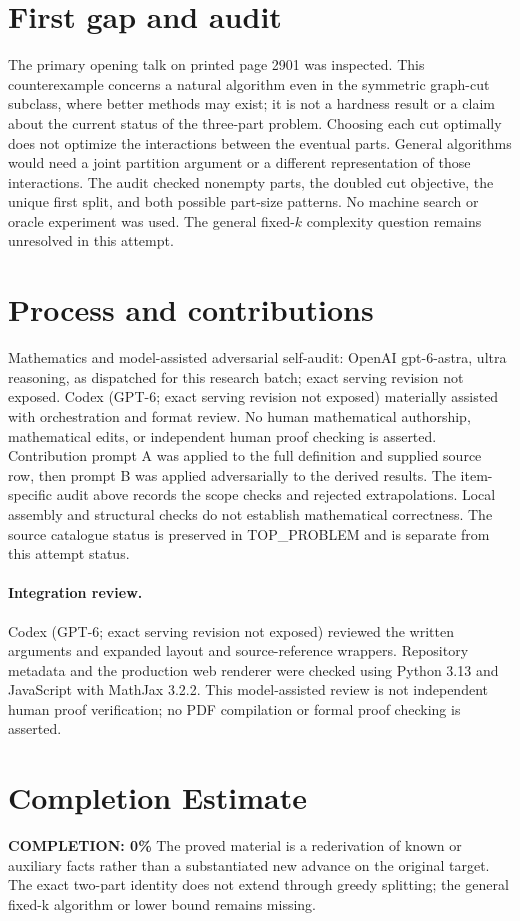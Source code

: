 \documentclass[11pt]{article}
\begin{document}
\section{First gap and audit}
The primary opening talk on printed page 2901 was inspected. This
counterexample concerns a natural algorithm even in the symmetric
graph-cut subclass, where better methods may exist; it is not a
hardness result or a claim about the current status of the three-part
problem. Choosing each cut optimally does not optimize the interactions
between the eventual parts. General algorithms would need a joint
partition argument or a different representation of those interactions.
The audit checked nonempty parts, the doubled cut objective, the
unique first split, and both possible part-size patterns. No machine
search or oracle experiment was used. The general fixed-$k$ complexity
question remains unresolved in this attempt.

\section{Process and contributions}
Mathematics and model-assisted adversarial self-audit: OpenAI gpt-6-astra, ultra reasoning, as dispatched for this research batch; exact serving revision not exposed. Codex (GPT-6; exact serving revision not exposed) materially assisted with orchestration and format review. No human mathematical authorship, mathematical edits, or independent human proof checking is asserted.
Contribution prompt A was applied to the full definition and supplied source row, then prompt B was applied adversarially to the derived results. The item-specific audit above records the scope checks and rejected extrapolations. Local assembly and structural checks do not establish mathematical correctness. The source catalogue status is preserved in TOP\_PROBLEM and is separate from this attempt status.
\paragraph{Integration review.} Codex (GPT-6; exact serving revision not exposed) reviewed the written arguments and expanded layout and source-reference wrappers. Repository metadata and the production web renderer were checked using Python 3.13 and JavaScript with MathJax 3.2.2. This model-assisted review is not independent human proof verification; no PDF compilation or formal proof checking is asserted.

\section{Completion Estimate}
\noindent\textbf{COMPLETION: 0\%}
The proved material is a rederivation of known or auxiliary facts rather than a substantiated new advance on the original target. The exact two-part identity does not extend through greedy splitting; the general fixed-k algorithm or lower bound remains missing.
\end{document}
